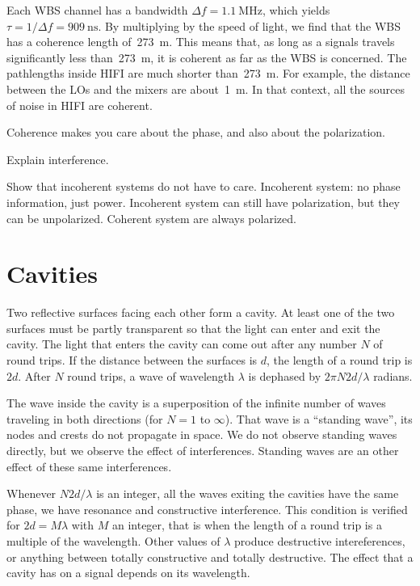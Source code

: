 Each WBS channel has a bandwidth $\Delta f = \SI{1.1}{\mega\hertz}$,
which yields $\tau = 1 / \Delta f = \SI{909}{\nano\second}$.
By multiplying by the speed of light, we find that the WBS has a coherence length of~\SI{273}{\meter}.
This means that, as long as a signals travels significantly less than~\SI{273}{\meter}, it is coherent as far as the WBS is concerned.
The pathlengths inside HIFI are much shorter than~\SI{273}{\meter}.
For example, the distance between the LOs and the mixers are about~\SI{1}{\meter}.
In that context, all the sources of noise in HIFI are coherent.

Coherence makes you care about the phase, and also about the polarization.

Explain interference.

Show that incoherent systems do not have to care.
Incoherent system: no phase information, just power.
Incoherent system can still have polarization, but they can be unpolarized.
Coherent system are always polarized.






\section{Cavities}
Two reflective surfaces facing each other form a cavity.
At least one of the two surfaces must be partly transparent so that the light can enter and exit the cavity.
The light that enters the cavity can come out after any number $N$ of round trips.
If the distance between the surfaces is $d$, the length of a round trip is $2d$.
After $N$ round trips, a wave of wavelength $\lambda$ is dephased by $2\pi N2d/\lambda$ radians.

The wave inside the cavity is a superposition of the infinite number of waves traveling in both directions (for $N=1$ to $\infty$).
That wave is a ``standing wave'', its nodes and crests do not propagate in space.
We do not observe standing waves directly, but we observe the effect of interferences.
Standing waves are an other effect of these same interferences.

Whenever $N2d/\lambda$ is an integer, all the waves exiting the cavities have the same phase, we have resonance and constructive interference.
This condition is verified for $2d=M\lambda$ with $M$ an integer, that is when the length of a round trip is a multiple of the wavelength.
Other values of $\lambda$ produce destructive intereferences, or anything between totally constructive and totally destructive.
The effect that a cavity has on a signal depends on its wavelength.

